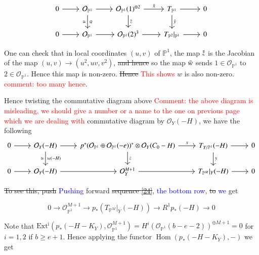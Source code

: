 \documentclass[11pt,twoside]{amsart}
\theoremstyle{plain}
\numberwithin{equation}{section}
\theoremstyle{definition}
\begin{document}
\[
\begin{tikzcd}\label{relative Euler and Euler}
  0 \arrow[r] & \mathcal{O}_{\mathbb{P}^1} \arrow[r] \arrow[d, "\Bar{w}", "\cong"'] & \mathcal{O}_{\mathbb{P}^1}(1)^{\oplus 2} \arrow[r, "\Bar{x}"] \arrow[d, "\Bar{z}"] & T_{\mathbb{P}^1} \arrow[r] \arrow[d, "\Bar{y}"] & 0 \\
   0 \arrow[r] & \mathcal{O}_{\mathbb{P}^1} \arrow[r] & \mathcal{O}_{\mathbb{P}^1}(2)^{3} \arrow[r] & T_{\mathbb{P}^2}|_{\mathbb{P}^1} \arrow[r] & 0
\end{tikzcd}
\]

One can check that in local coordinates $(u,v)$ of $\mathbb{P}^1$, the map $\Bar{z}$ is the Jacobian of the map $(u,v) \to (u^2, uv, v^2)$, \sout{and hence} so the map $\Bar{w}$ sends $1 \in \mathcal{O}_{\mathbb{P}^1}$ to $2 \in \mathcal{O}_{\mathbb{P}^1}$. Hence this map is non-zero. \sout{Hence} \textcolor{red}{This shows} $w$ is also non-zero. \textcolor{red}{comment: too many hence}.


Hence twisting the commutative diagram above \textcolor{red}{Comment: the above diagram is misleading, we should give a number or a name to the one on previous page which we are dealing with} commutative diagram by $\mathcal{O}_Y(-H)$, we have the following
\begin{equation}
\begin{tikzcd}\label{relative Euler and Euler}
  0 \arrow[r] & \mathcal{O}_Y(-H) \arrow[r] \arrow[d, "w(-H)", "\cong"'] & p^*(\mathcal{O}_{\mathbb{P}^1} \oplus \mathcal{O}_{\mathbb{P}^1}(-e))^* \otimes \mathcal{O}_Y(C_0-H) \arrow[r, "x"] \arrow[d, "z"] & T_{Y/\mathbb{P}^1}(-H) \arrow[r] \arrow[d, "y"] & 0 \\
   0 \arrow[r] & \mathcal{O}_Y(-H) \arrow[r] & \mathcal{O}_Y^{M+1} \arrow[r] & T_{\mathbb{P}^M}|_Y(-H) \arrow[r] & 0
\end{tikzcd}
\end{equation}
\color{black}
 
 \sout{To see this, push} \textcolor{blue}{Pushing} forward \sout{sequence \ref{24}}, \textcolor{blue}{the bottom row}, \sout{to} \textcolor{blue}{we} get 

 \begin{equation}\label{25}
     0 \to \mathcal{O}_{\mathbb{P}^1}^{M+1} \to p_*(T_{\mathbb{P}^M}|_Y(-H)) \to R^1p_*(-H) \to 0
 \end{equation}

Note that $\operatorname{Ext^i}(p_*(-H-K_Y),  \mathcal{O}_{\mathbb{P}^1}^{M+1}) = H^i(\mathcal{O}_{\mathbb{P}^1}(b-e-2))^{\oplus M+1} = 0$ for $i = 1,2$ if $b \geq e+1$. Hence applying the functor $\operatorname{Hom}(p_*(-H-K_Y), -)$ we get 
\end{document}
